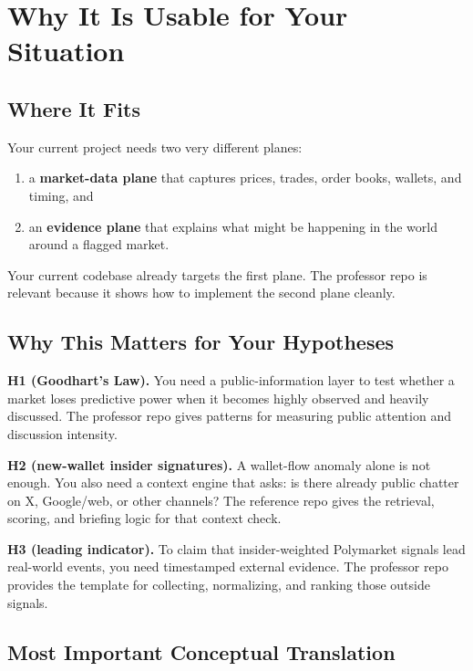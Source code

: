 \documentclass[11pt, letterpaper]{article}
\begin{document}
\section{Why It Is Usable for Your Situation}

\subsection{Where It Fits}

Your current project needs two very different planes:

\begin{enumerate}[nosep]
    \item a \textbf{market-data plane} that captures prices, trades, order books, wallets, and timing, and
    \item an \textbf{evidence plane} that explains what might be happening in the world around a flagged market.
\end{enumerate}

Your current codebase already targets the first plane. The professor repo is relevant because it shows how to implement the second plane cleanly.

\subsection{Why This Matters for Your Hypotheses}

\textbf{H1 (Goodhart's Law).} You need a public-information layer to test whether a market loses predictive power when it becomes highly observed and heavily discussed. The professor repo gives patterns for measuring public attention and discussion intensity.

\textbf{H2 (new-wallet insider signatures).} A wallet-flow anomaly alone is not enough. You also need a context engine that asks: is there already public chatter on X, Google/web, or other channels? The reference repo gives the retrieval, scoring, and briefing logic for that context check.

\textbf{H3 (leading indicator).} To claim that insider-weighted Polymarket signals lead real-world events, you need timestamped external evidence. The professor repo provides the template for collecting, normalizing, and ranking those outside signals.

\subsection{Most Important Conceptual Translation}
\end{document}
